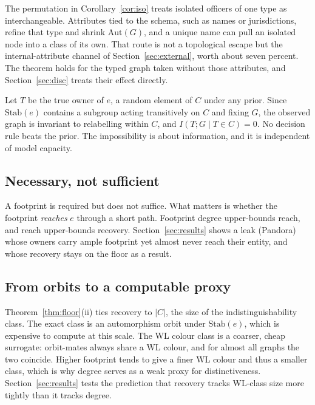 \documentclass[sigconf]{acmart}
\begin{document}
The permutation in Corollary~\ref{cor:iso} treats isolated officers of one type
as interchangeable. Attributes tied to the schema, such as names or
jurisdictions, refine that type and shrink $\mathrm{Aut}(G)$, and a unique name
can pull an isolated node into a class of its own. That route is not a topological
escape but the internal-attribute channel of Section~\ref{sec:external}, worth
about seven percent. The theorem holds for the typed graph taken without those
attributes, and Section~\ref{sec:disc} treats their effect directly.

\begin{corollary}\label{cor:mi}
Let $T$ be the true owner of $e$, a random element of $C$ under any prior. Since
$\mathrm{Stab}(e)$ contains a subgroup acting transitively on $C$ and fixing $G$,
the observed graph is invariant to relabelling within $C$, and
$I(T;G\mid T\!\in\!C)=0$. No decision rule beats the prior. The impossibility is
about information, and it is independent of model capacity.
\end{corollary}

\subsection{Necessary, not sufficient}
A footprint is required but does not suffice. What matters is whether the
footprint \emph{reaches} $e$ through a short path. Footprint degree upper-bounds
reach, and reach upper-bounds recovery. Section~\ref{sec:results} shows a leak
(Pandora) whose owners carry ample footprint yet almost never reach their
entity, and whose recovery stays on the floor as a result.

\subsection{From orbits to a computable proxy}
Theorem~\ref{thm:floor}(ii) ties recovery to $|C|$, the size of the
indistinguishability class. The exact class is an automorphism orbit under
$\mathrm{Stab}(e)$, which is expensive to compute at this scale. The WL colour
class is a coarser, cheap surrogate: orbit-mates always share a WL colour, and
for almost all graphs the two coincide. Higher footprint tends to give a finer WL
colour and thus a smaller class, which is why degree serves as a weak proxy for
distinctiveness. Section~\ref{sec:results} tests the prediction that recovery
tracks WL-class size more tightly than it tracks degree.

\end{document}
